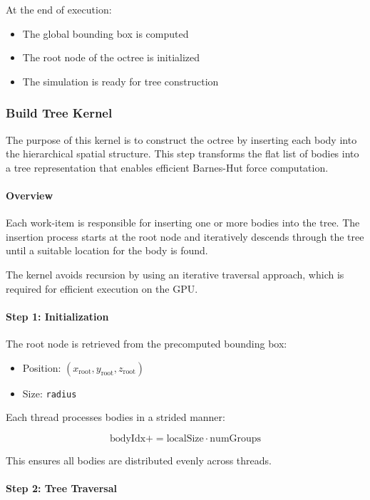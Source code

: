 \documentclass[12pt]{article}
\begin{document}
At the end of execution:
\begin{itemize}
    \item The global bounding box is computed
    \item The root node of the octree is initialized
    \item The simulation is ready for tree construction
\end{itemize}

\subsubsection{Build Tree Kernel}

The purpose of this kernel is to construct the octree by inserting each body
into the hierarchical spatial structure. This step transforms the flat list
of bodies into a tree representation that enables efficient Barnes-Hut force computation.

\paragraph{Overview}

Each work-item is responsible for inserting one or more bodies into the tree.
The insertion process starts at the root node and iteratively descends through
the tree until a suitable location for the body is found.

The kernel avoids recursion by using an iterative traversal approach,
which is required for efficient execution on the GPU.

\paragraph{Step 1: Initialization}

The root node is retrieved from the precomputed bounding box:

\begin{itemize}
    \item Position: $(x_{\text{root}}, y_{\text{root}}, z_{\text{root}})$
    \item Size: \texttt{radius}
\end{itemize}

Each thread processes bodies in a strided manner:

\[
\text{bodyIdx} += \text{localSize} \cdot \text{numGroups}
\]

This ensures all bodies are distributed evenly across threads.

\paragraph{Step 2: Tree Traversal}
\end{document}
